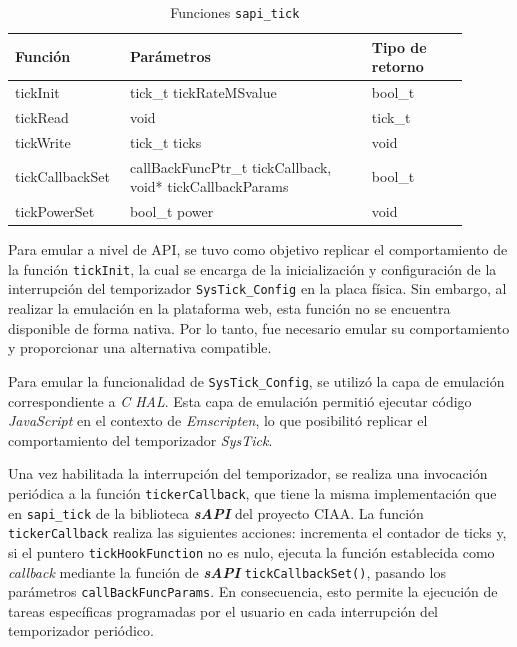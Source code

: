 \begin{table}[h]
	\centering
	\caption[Funciones \texttt{sapi\_tick}]{Funciones \texttt{sapi\_tick}}
	\begin{tabular}{p{0.20\linewidth} p{0.50\linewidth}  p{0.20\linewidth}}    
		\toprule
		\textbf{Función} 	 & \textbf{Parámetros} 		& \textbf{Tipo de retorno}  \\
		\midrule
		tickInit & tick\_t tickRateMSvalue 		&  bool\_t \\		
		tickRead	 & void				&  tick\_t \\
		tickWrite	 & tick\_t ticks 				& void \\
		tickCallbackSet	 & callBackFuncPtr\_t tickCallback, void* tickCallbackParams				&  bool\_t \\
		tickPowerSet & bool\_t power 		&  void \\	
		\bottomrule
		\hline
	\end{tabular}
	\label{tab:sapiTick}
\end{table}

Para emular a nivel de API, se tuvo como objetivo replicar el comportamiento de la función \texttt{tickInit}, la cual se encarga de la inicialización y configuración de la interrupción del temporizador \texttt{SysTick\_Config} en la placa física. Sin embargo, al realizar la emulación en la plataforma web, esta función no se encuentra disponible de forma nativa. Por lo tanto, fue necesario emular su comportamiento y proporcionar una alternativa compatible.

Para emular la funcionalidad de \texttt{SysTick\_Config}, se utilizó la capa de emulación correspondiente a \textit{C HAL}. Esta capa de emulación permitió ejecutar código \textit{JavaScript} en el contexto de \textit{Emscripten}, lo que posibilitó replicar el comportamiento del temporizador \textit{SysTick}. 

Una vez habilitada la interrupción del temporizador, se realiza una invocación periódica a la función \texttt{tickerCallback}, que tiene la misma implementación que en \texttt{sapi\_tick} de la biblioteca \textit{\textbf{sAPI}} del proyecto CIAA. La función \newline \texttt{tickerCallback} realiza las siguientes acciones: incrementa el contador de ticks y, si el puntero \texttt{tickHookFunction} no es nulo, ejecuta la función establecida como \textit{callback} mediante la función de \textit{\textbf{sAPI}} \texttt{tickCallbackSet()}, pasando los parámetros \texttt{callBackFuncParams}. En consecuencia, esto permite la ejecución de tareas específicas programadas por el usuario en cada interrupción del temporizador periódico.

